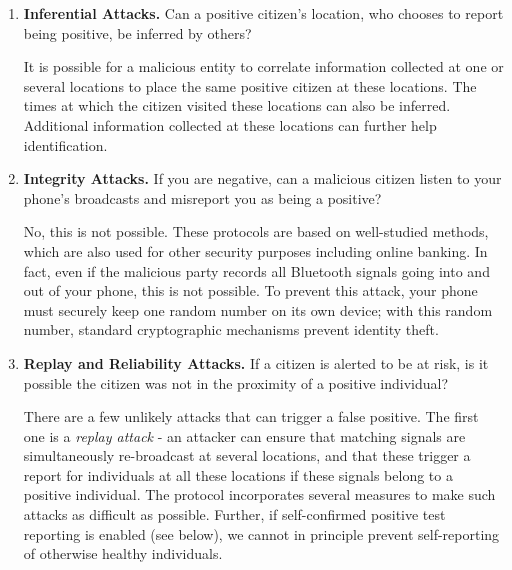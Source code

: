 \documentclass{article}
\newcommand{\sk}[1]{\textsf{\color{magenta} SK: #1}}
\begin{document}
\begin{enumerate}[leftmargin=*]

  \item \textbf{Inferential Attacks.} Can a positive citizen's location, who chooses to report being positive, be inferred by others?
  
  It is possible for a malicious entity to correlate information collected at one or several locations to place the same positive citizen at these locations. The times at which the citizen visited these locations can also be inferred. Additional information collected at these locations can further help identification. 


\item \textbf{Integrity Attacks.} If you are negative, can a malicious citizen listen to your phone's broadcasts and misreport you as being a positive?

   No, this is not possible. These protocols are based on well-studied methods, which are also used for other security purposes including online banking. In fact, even if the malicious party records all Bluetooth signals going into and out of your phone, this is not possible.   To prevent this attack, your phone must securely keep one random number on its own device; with this random number, standard cryptographic mechanisms prevent identity theft. 
   

   
    \item \textbf{Replay and Reliability Attacks.}  If a citizen is alerted to be at risk, is it possible the citizen was not in the proximity of a positive individual?  
    
    There are a few unlikely attacks that can trigger a false positive. The first one is a {\em replay attack} - an attacker can ensure that matching signals are simultaneously re-broadcast at several locations, and that these trigger a report for individuals at all these locations if these signals belong to a positive individual. The protocol incorporates several measures to make such attacks as difficult as possible. Further, if self-confirmed positive test reporting is enabled (see below), we cannot in principle prevent self-reporting of otherwise healthy individuals. 


\end{enumerate}
\end{document}
